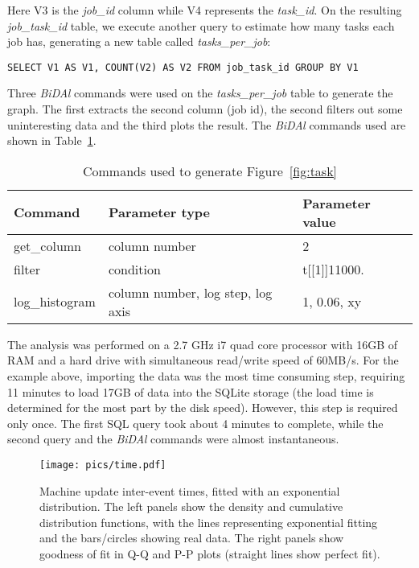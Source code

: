 \documentclass{article}
\begin{document}
Here V3 is the \emph{job\_id} column while V4 represents the \emph{task\_id}. On the resulting \emph{job\_task\_id} table, we execute another query to estimate how many tasks each job has, generating a new table called \emph{tasks\_per\_job}:

{\footnotesize\begin{verbatim}SELECT V1 AS V1, COUNT(V2) AS V2 FROM job_task_id GROUP BY V1\end{verbatim}}

Three \emph{BiDAl} commands were used on the  \emph{tasks\_per\_job} table to generate the graph. The first extracts the second column (job id), the second filters out some uninteresting data and the third plots the result. The \emph{BiDAl} commands used are shown in Table~\ref{tab:comm1}.


\begin{table}[h]
\begin{tabular}{|p{2cm}| p{5cm} |p{3cm}|}
\hline Command & Parameter type &Parameter value   \\
\hline\hline
get\_column& column number&2\\ \hline
filter&condition& t[[1]]11000.\\ \hline
log\_histogram&column number, log step, log axis& 1, 0.06, xy\\ 
\hline
\end{tabular}
\caption{Commands used to generate Figure~\ref{fig:task}}
\label{tab:comm1}     
\end{table}


The analysis was performed on a 2.7 GHz i7 quad core processor with 16GB of RAM and a hard drive with simultaneous read/write speed of 60MB/s. For the example above, importing the data was the most time consuming step, requiring 11 minutes to load 17GB of data into the SQLite storage (the load time is determined for the most part by the disk speed). However, this step is required only once. The first SQL query took about 4 minutes to complete, while the second query and the \emph{BiDAl} commands were almost instantaneous.


\begin{figure}
\centering
  \texttt{[image: pics/time.pdf]}
\caption{Machine update inter-event times, fitted with  an exponential distribution. The left panels show the density and cumulative distribution functions, with the lines representing exponential fitting and the bars/circles showing real data. The right panels show goodness of fit in Q-Q and P-P plots (straight lines show perfect fit).}
\label{fig:time}       
\end{figure}
\end{document}
